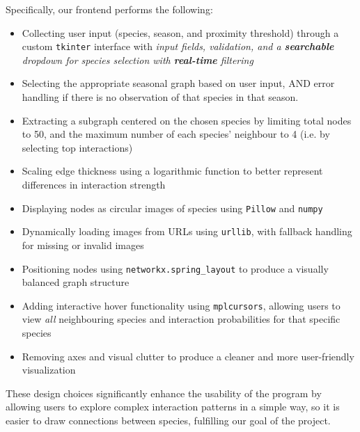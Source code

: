 \documentclass{article}
\begin{document}
Specifically, our frontend performs the following:
\begin{itemize}
    \item Collecting user input (species, season, and proximity threshold) through a custom \texttt{tkinter} interface with \textit{input fields, validation, and a \textbf{searchable} dropdown for species selection with \textbf{real-time} filtering}
    \item Selecting the appropriate seasonal graph based on user input, AND error handling if there is no observation of that species in that season.
    \item Extracting a subgraph centered on the chosen species by limiting total nodes to 50, and the maximum number of each species' neighbour to 4 (i.e. by selecting top interactions)
    \item Scaling edge thickness using a logarithmic function to better represent differences in interaction strength
    \item Displaying nodes as circular images of species using \texttt{Pillow} and \texttt{numpy}
    \item Dynamically loading images from URLs using \texttt{urllib}, with fallback handling for missing or invalid images
    \item Positioning nodes using \texttt{networkx.spring\_layout} to produce a visually balanced graph structure
    \item Adding interactive hover functionality using \texttt{mplcursors}, allowing users to view \textit{all} neighbouring species and interaction probabilities for that specific species
    \item Removing axes and visual clutter to produce a cleaner and more user-friendly visualization
\end{itemize}
These design choices significantly enhance the usability of the program by allowing users to explore complex interaction patterns in a simple way, so it is easier to draw connections between species, fulfilling our goal of the project. 
\end{document}
